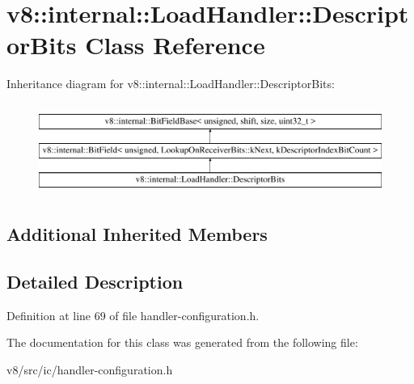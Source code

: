 \hypertarget{classv8_1_1internal_1_1LoadHandler_1_1DescriptorBits}{}\section{v8\+:\+:internal\+:\+:Load\+Handler\+:\+:Descriptor\+Bits Class Reference}
\label{classv8_1_1internal_1_1LoadHandler_1_1DescriptorBits}
Inheritance diagram for v8\+:\+:internal\+:\+:Load\+Handler\+:\+:Descriptor\+Bits\+:\begin{figure}[H]
\begin{center}
\leavevmode
\includegraphics[height=3.000000cm]{classv8_1_1internal_1_1LoadHandler_1_1DescriptorBits}
\end{center}
\end{figure}
\subsection*{Additional Inherited Members}


\subsection{Detailed Description}


Definition at line 69 of file handler-\/configuration.\+h.



The documentation for this class was generated from the following file\+:\begin{DoxyCompactItemize}
\item 
v8/src/ic/handler-\/configuration.\+h\end{DoxyCompactItemize}
